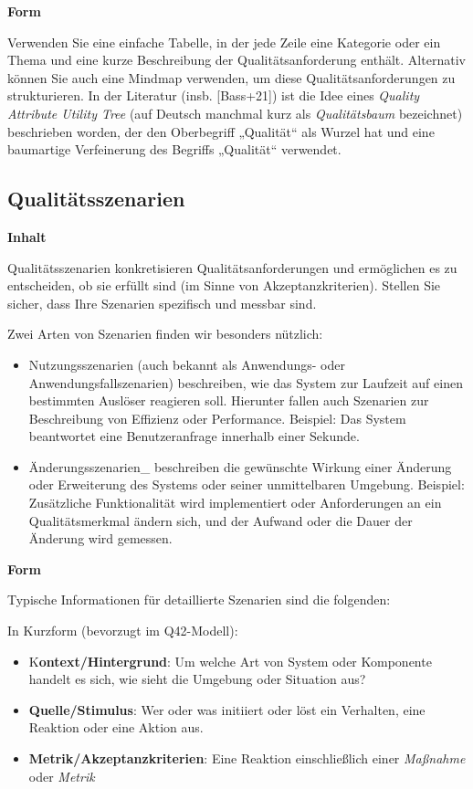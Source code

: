 \documentclass[
]{article}
\begin{document}
\textbf{Form}

Verwenden Sie eine einfache Tabelle, in der jede Zeile eine Kategorie
oder ein Thema und eine kurze Beschreibung der Qualitätsanforderung
enthält. Alternativ können Sie auch eine Mindmap verwenden, um diese
Qualitätsanforderungen zu strukturieren. In der Literatur (insb.
{[}Bass+21{]}) ist die Idee eines \emph{Quality Attribute Utility Tree}
(auf Deutsch manchmal kurz als \emph{Qualitätsbaum} bezeichnet)
beschrieben worden, der den Oberbegriff „Qualität`` als Wurzel hat und
eine baumartige Verfeinerung des Begriffs „Qualität`` verwendet.

\subsection{Qualitätsszenarien}\label{_qualituxe4tsszenarien}

\textbf{Inhalt}

Qualitätsszenarien konkretisieren Qualitätsanforderungen und ermöglichen
es zu entscheiden, ob sie erfüllt sind (im Sinne von
Akzeptanzkriterien). Stellen Sie sicher, dass Ihre Szenarien spezifisch
und messbar sind.

Zwei Arten von Szenarien finden wir besonders nützlich:

\begin{itemize}
\item
  Nutzungsszenarien (auch bekannt als Anwendungs- oder
  Anwendungsfallszenarien) beschreiben, wie das System zur Laufzeit auf
  einen bestimmten Auslöser reagieren soll. Hierunter fallen auch
  Szenarien zur Beschreibung von Effizienz oder Performance. Beispiel:
  Das System beantwortet eine Benutzeranfrage innerhalb einer Sekunde.
\item
  Änderungsszenarien\_ beschreiben die gewünschte Wirkung einer Änderung
  oder Erweiterung des Systems oder seiner unmittelbaren Umgebung.
  Beispiel: Zusätzliche Funktionalität wird implementiert oder
  Anforderungen an ein Qualitätsmerkmal ändern sich, und der Aufwand
  oder die Dauer der Änderung wird gemessen.
\end{itemize}

\textbf{Form}

Typische Informationen für detaillierte Szenarien sind die folgenden:

In Kurzform (bevorzugt im Q42-Modell):

\begin{itemize}
\item
  K\textbf{ontext/Hintergrund}: Um welche Art von System oder Komponente
  handelt es sich, wie sieht die Umgebung oder Situation aus?
\item
  \textbf{Quelle/Stimulus}: Wer oder was initiiert oder löst ein
  Verhalten, eine Reaktion oder eine Aktion aus.
\item
  \textbf{Metrik/Akzeptanzkriterien}: Eine Reaktion einschließlich einer
  \emph{Maßnahme} oder \emph{Metrik}
\end{itemize}
\end{document}
